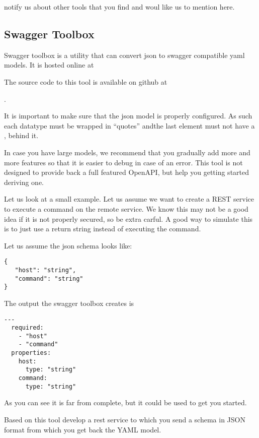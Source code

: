 \begin{exercise}
notify us about other tools that you find and woul like us to mention here.
\end{exercise}

\subsection{Swagger Toolbox}
\label{s:swagger-toolbox}

Swagger toolbox is a utility that can convert json to swagger
compatible yaml models. It is hosted online at 


The source code to this tool is available on github at

.

It is important to make sure that the json model is properly
configured. As such each datatype must be wrapped in ``quotes'' andthe
last element must not have a , behind it. 

In case you have large models, we recommend that you gradually add
more and more features so that it is easier to debug in case of an
error. This tool is not designed to provide back a full featured
OpenAPI, but help you getting started deriving one.

Let us look at a small example. Let us assume we want to create a REST
service to execute a command on the remote service. We  know this may
not be a good idea if it is not properly secured, so be extra
carful. A good way to simulate this is to just use a return string
instead of executing the command.

Let us assume the json schema looks like:

\begin{lstlisting}
{
   "host": "string",
   "command": "string"
}
\end{lstlisting}

The output the swagger toolbox creates is

\begin{lstlisting}
---
  required: 
    - "host"
    - "command"
  properties: 
    host: 
      type: "string"
    command: 
      type: "string"
\end{lstlisting}

As you can see it is far from complete, but it could be used to get
you started.

\begin{exercise}
Based on this tool develop a rest service to which you send a schema
in JSON format from which you get back the YAML model.
\end{exercise}



